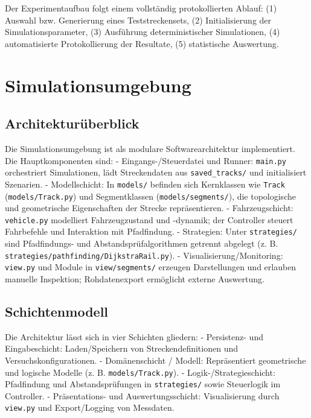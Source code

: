 Der Experimentaufbau folgt einem vollständig protokollierten Ablauf: (1) Auswahl bzw. Generierung eines Teststreckensets, (2) Initialisierung der Simulationsparameter, (3) Ausführung deterministischer Simulationen, (4) automatisierte Protokollierung der Resultate, (5) statistische Auswertung.

\section{Simulationsumgebung}
\label{ch:Methodik:sec:Simulationsumgebung}

\subsection*{Architekturüberblick}
Die Simulationsumgebung ist als modulare Softwarearchitektur implementiert. Die Hauptkomponenten sind:
- Eingangs-/Steuerdatei und Runner: \texttt{main.py} orchestriert Simulationen, lädt Streckendaten aus \texttt{saved\_tracks/} und initialisiert Szenarien.
- Modellschicht: In \texttt{models/} befinden sich Kernklassen wie \texttt{Track} (\texttt{models/Track.py}) und Segmentklassen (\texttt{models/segments/}), die topologische und geometrische Eigenschaften der Strecke repräsentieren.
- Fahrzeugschicht: \texttt{vehicle.py} modelliert Fahrzeugzustand und -dynamik; der Controller steuert Fahrbefehle und Interaktion mit Pfadfindung.
- Strategien: Unter \texttt{strategies/} sind Pfadfindungs- und Abstandsprüfalgorithmen getrennt abgelegt (z. B. \texttt{strategies/pathfinding/DijkstraRail.py}).
- Visualisierung/Monitoring: \texttt{view.py} und Module in \texttt{view/segments/} erzeugen Darstellungen und erlauben manuelle Inspektion; Rohdatenexport ermöglicht externe Auswertung.

\subsection*{Schichtenmodell}
Die Architektur lässt sich in vier Schichten gliedern:
- Persistenz- und Eingabeschicht: Laden/Speichern von Streckendefinitionen und Versuchskonfigurationen.
- Domänenschicht / Modell: Repräsentiert geometrische und logische Modelle (z. B. \texttt{models/Track.py}).
- Logik-/Strategieschicht: Pfadfindung und Abstandsprüfungen in \texttt{strategies/} sowie Steuerlogik im Controller.
- Präsentations- und Auswertungsschicht: Visualisierung durch \texttt{view.py} und Export/Logging von Messdaten.

